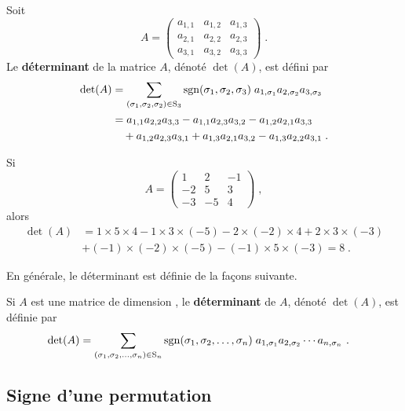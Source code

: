 {\begin{focus}{\dfn} 
Soit
\[
A = \begin{pmatrix} a_{1,1} & a_{1,2} & a_{1,3} \\
a_{2,1} & a_{2,2} & a_{2,3} \\
a_{3,1} & a_{3,2} & a_{3,3}
\end{pmatrix} \; .
\]
Le {\bfseries déterminant} de la matrice $A$, dénoté $\det(A)$, est
défini par
\begin{align*}
\det(A) &= \sum_{(\sigma_1,\sigma_2,\sigma_2)\in \mathrm{S}_{3}} \operatorname{sgn}
(\sigma_1,\sigma_2,\sigma_3)\; a_{1,\sigma_1} a_{2,\sigma_2} a_{3,\sigma_3} \\
&= a_{1,1}a_{2,2}a_{3,3} - a_{1,1}a_{2,3}a_{3,2}
- a_{1,2}a_{2,1}a_{3,3} \\
&\quad + a_{1,2}a_{2,3}a_{3,1}
+ a_{1,3}a_{2,1}a_{3,2} - a_{1,3}a_{2,2}a_{3,1} \; .
\end{align*}
\end{focus}

\begin{egg}
Si
\[
A= \begin{pmatrix} 1 & 2 & -1 \\ -2 & 5 & 3 \\
-3 & -5 & 4 \end{pmatrix} \; ,
\]
alors
\begin{align*}
\det(A) &= 1\times 5 \times 4 - 1\times 3 \times (-5)
- 2 \times (-2)\times 4 + 2 \times 3 \times (-3) \\
& +(-1)\times (-2)\times (-5) - (-1)\times 5 \times (-3)
= 8 \; .
\end{align*}
\end{egg}

En générale, le déterminant est définie de la façons suivante.

\begin{focus}{\dfn} 
Si $A$ est une matrice de dimension \nn, le {\bfseries déterminant} de
$A$, dénoté $\det(A)$, est définie par
\begin{align*}
\det(A) &= \sum_{(\sigma_1,\sigma_2,\ldots,\sigma_n)\in \mathrm{S}_{n}} \operatorname{sgn}
(\sigma_1,\sigma_2,\ldots,\sigma_n)\;
a_{1,\sigma_1} a_{2,\sigma_2}\cdots  a_{n,\sigma_n} \ .
\end{align*}
\label{gendeffdet}
\end{focus}

\subsection{Signe d'une permutation \theory}

}
